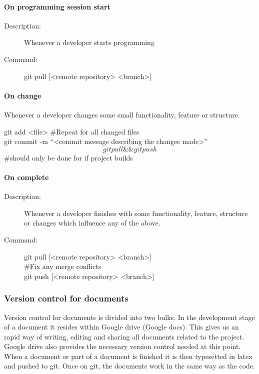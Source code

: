 \paragraph{On programming session start}
\begin{description}
\item[Description:] Whenever a developer starts programming
\item[Command:] git pull [<remote repository> <branch>]
\end{description}

\paragraph{On change}
\begin{description}[style=multiline]
\item[Description:] Whenever a developer changes some small functionality, feature or structure.
\item[Command:] git add <file> \#Repeat for all changed files \\ git commit -m “<commit message describing the changes made>” \\  \[git pull \&\& git push\] \#should only be done for if project builds
\end{description}

\paragraph{On complete}
\begin{description}
\item[Description:]  Whenever a developer finishes with some functionality, feature,  structure or changes which influence 				any of the above.
\item[Command:]  git pull [<remote repository> <branch>] \\  \#Fix any merge conflicts \\ git push [<remote repository> <branch>]
\end{description}

\subsubsection{Version control for documents}
Version control for documents is divided into two bulks. In the development stage of a document it resides within Google drive (Google docs). This gives us an rapid way of writing, editing and sharing all documents related to the project. Google drive also provides the necessary version control needed at this point. When a document or part of a document is finished it is then typesetted in latex and pushed to git. Once on git, the documents work in the same way as the code.  


